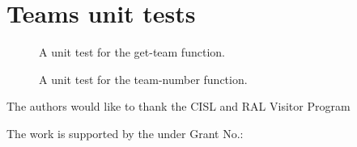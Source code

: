 

%




\appendix
\section{Teams unit tests}

\begin{figure}
  
  \caption{A unit test for the get-team function.\label{figure:get-team-test}}
\end{figure}

%

\begin{figure}
  
  \caption{A unit test for the team-number function.\label{figure:team-number-test}}
\end{figure}


\begin{acks}
  The authors would like to thank the CISL and RAL Visitor Program

  The work is
  supported by the  under Grant
  No.:~

\end{acks}
